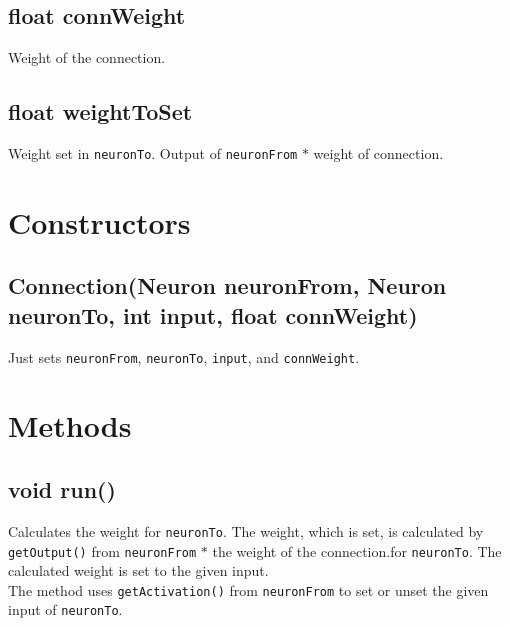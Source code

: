 \subsection{float connWeight}
Weight of the connection.

\subsection{float weightToSet}
Weight set in \texttt{neuronTo}. Output of \texttt{neuronFrom} $*$ weight of connection.

\section{Constructors}
\subsection{Connection(Neuron neuronFrom, Neuron neuronTo, int input, float connWeight)}
Just sets \texttt{neuronFrom}, \texttt{neuronTo}, \texttt{input}, and \texttt{connWeight}.

\section{Methods}
\subsection{void run()}
Calculates the weight for \texttt{neuronTo}. The weight, which is set, is calculated by \texttt{getOutput()} from \texttt{neuronFrom} $*$ the weight of the connection.for \texttt{neuronTo}. The calculated weight is set to the given input.\\
The method uses \texttt{getActivation()} from \texttt{neuronFrom} to set or unset the given input of \texttt{neuronTo}.